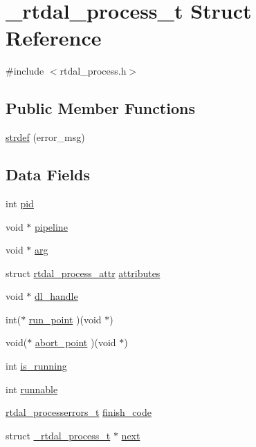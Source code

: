 \hypertarget{struct__rtdal__process__t}{\section{\-\_\-rtdal\-\_\-process\-\_\-t Struct Reference}
\label{struct__rtdal__process__t}
}


{\ttfamily \#include $<$rtdal\-\_\-process.\-h$>$}

\subsection*{Public Member Functions}
\begin{DoxyCompactItemize}
\item 
\hyperlink{struct__rtdal__process__t_ac32e9359a2726e2fec062e17e02397e1}{strdef} (error\-\_\-msg)
\end{DoxyCompactItemize}
\subsection*{Data Fields}
\begin{DoxyCompactItemize}
\item 
int \hyperlink{struct__rtdal__process__t_a7826a585e78280654a2cf5e2c07d318e}{pid}
\item 
void $\ast$ \hyperlink{struct__rtdal__process__t_a9ec4e6cea3e83c2d3f6b575545975b30}{pipeline}
\item 
void $\ast$ \hyperlink{struct__rtdal__process__t_a599955d623bc30d0dbf8aca3189b1696}{arg}
\item 
struct \hyperlink{structrtdal__process__attr}{rtdal\-\_\-process\-\_\-attr} \hyperlink{struct__rtdal__process__t_ab9d4fcf66abec2cf4495a7b6574fea52}{attributes}
\item 
void $\ast$ \hyperlink{struct__rtdal__process__t_aa5f45d6f44b73777366345845eb1bb99}{dl\-\_\-handle}
\item 
int($\ast$ \hyperlink{struct__rtdal__process__t_a95c19062dd6dc2a8b5d03adc03fa97df}{run\-\_\-point} )(void $\ast$)
\item 
void($\ast$ \hyperlink{struct__rtdal__process__t_aa1cfbd6b6445c333fe1e354b8ddd33dc}{abort\-\_\-point} )(void $\ast$)
\item 
int \hyperlink{struct__rtdal__process__t_a352c3d3dbdc8bec9b6177ab1fd0dddc2}{is\-\_\-running}
\item 
int \hyperlink{struct__rtdal__process__t_a1fca7ce8ac2083e4a97e0e855f25de62}{runnable}
\item 
\hyperlink{group__process_ga825233f1e8a1bd1e1eb99e1301f36a57}{rtdal\-\_\-processerrors\-\_\-t} \hyperlink{struct__rtdal__process__t_a236ea6c8665b6072ae6b32342bded647}{finish\-\_\-code}
\item 
struct \hyperlink{struct__rtdal__process__t}{\-\_\-rtdal\-\_\-process\-\_\-t} $\ast$ \hyperlink{struct__rtdal__process__t_a623279364fe34c5d8743b2e73124a070}{next}
\end{DoxyCompactItemize}


